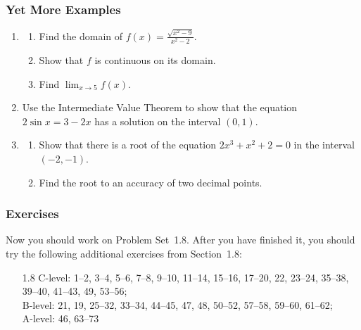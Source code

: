 \documentclass[serif,ignorenonframetext]{beamer}
\newcommand{\ds}{\displaystyle}
\begin{document}
\begin{frame}
  \frametitle{Yet More Examples}
  \begin{enumerate}
  \item 
    \begin{enumerate}
    \item Find the domain of $\ds f(x)=\frac{\sqrt{x^2-9}}{x^2-2}$.
    \item Show that $f$ is continuous on its domain.
    \item Find $\ds \lim_{x\to 5} f(x)$.
    \end{enumerate}
  \item Use the Intermediate Value Theorem to show that the equation
    $2\sin x = 3-2x$ has a solution on the interval $(0,1)$.
  \item 
    \begin{enumerate}
    \item Show that
      there is a root of the equation $\ds 2x^3+x^2+2=0$ in the interval
      $(-2,-1)$.
    \item Find the root to an accuracy of two decimal points.
    \end{enumerate}
  \end{enumerate} 
\end{frame}


\begin{frame}
  \frametitle{Exercises}
  Now you should work on Problem Set~1.8.  After you have finished it,
  you should try the following additional exercises from Section~1.8:
  \begin{itemize}
  \item[1.8] C-level: 1--2, 3--4, 5--6, 7--8, 9--10, 11--14, 15--16, 17--20,
    22, 23--24, 35--38, 39--40, 41--43, 49, 53--56;  \\
    B-level: 21, 19, 25--32, 33--34, 44--45, 47, 48, 50--52, 57--58, 59--60,
    61--62; \\
    A-level: 46, 63--73
  \end{itemize}
\end{frame}
\end{document}

